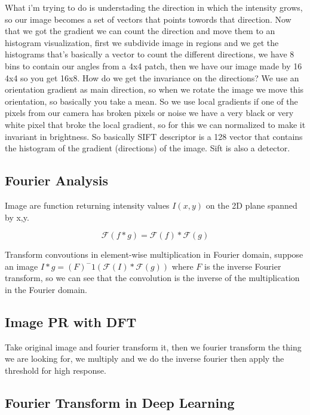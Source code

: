\documentclass[12pt]{book}
\begin{document}
What i'm trying to do is understading the direction in which the intensity grows, so our image becomes a set of vectors that points towords that direction. Now that we got the gradient we can count the direction and move them to an histogram visualization, first we subdivide image in regions and we get the histograms that's basically a vector to count the different directions, we have 8 bins to contain our angles from a 4x4 patch, then we have our image made by 16 4x4 so you get 16x8. 
How do we get the invariance on the directions? We use an orientation gradient as main direction, so when we rotate the image we move this orientation, so basically you take a mean. \newline
So we use local gradients if one of the pixels from our camera has broken pixels or noise we have a very black or very white pixel that broke the local gradient, so for this we can normalized to make it invariant in brightness.
So basically SIFT descriptor is a 128 vector that contains the histogram of the gradient (directions) of the image. Sift is also a detector.

\subsection{Fourier Analysis}
Image are function returning intensity values $I(x,y)$ on the 2D plane spanned by x,y.\newline

\begin{equation}
	\mathcal{F}(f * g) = \mathcal{F}(f) * \mathcal{F}(g) 
\end{equation}

Transform convoutions in element-wise multiplication in Fourier domain, suppose an image $I * g = (F)^-1(\mathcal{F}(I) * \mathcal{F}(g))$ where $F$ is the inverse Fourier transform, so we can see that the convolution is the inverse of the multiplication in the Fourier domain. \newline

\subsection{Image PR with DFT}
Take original image and fourier transform it, then we fourier transform the thing we are looking for, we multiply and we do the inverse fourier then apply the threshold for high response.


\subsection{Fourier Transform in Deep Learning}
\end{document}
